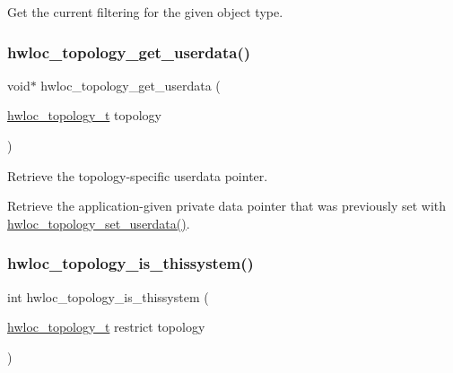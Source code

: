 Get the current filtering for the given object type. 

\mbox{\label{a00193_ga91f992f8d6c4905b2d3c4f43e509c2a3}} 
\subsubsection{\texorpdfstring{hwloc\+\_\+topology\+\_\+get\+\_\+userdata()}{hwloc\_topology\_get\_userdata()}}
{\footnotesize\ttfamily void$\ast$ hwloc\+\_\+topology\+\_\+get\+\_\+userdata (\begin{DoxyParamCaption}\item[{\hyperlink{a00186_ga9d1e76ee15a7dee158b786c30b6a6e38}{hwloc\+\_\+topology\+\_\+t}}]{topology }\end{DoxyParamCaption})}



Retrieve the topology-\/specific userdata pointer. 

Retrieve the application-\/given private data pointer that was previously set with \hyperlink{a00193_ga2cc7b7b155cba58dda203e54f1637b9c}{hwloc\+\_\+topology\+\_\+set\+\_\+userdata()}. \mbox{\label{a00193_ga68ffdcfd9175cdf40709801092f18017}} 
\subsubsection{\texorpdfstring{hwloc\+\_\+topology\+\_\+is\+\_\+thissystem()}{hwloc\_topology\_is\_thissystem()}}
{\footnotesize\ttfamily int hwloc\+\_\+topology\+\_\+is\+\_\+thissystem (\begin{DoxyParamCaption}\item[{\hyperlink{a00186_ga9d1e76ee15a7dee158b786c30b6a6e38}{hwloc\+\_\+topology\+\_\+t} restrict}]{topology }\end{DoxyParamCaption})}




